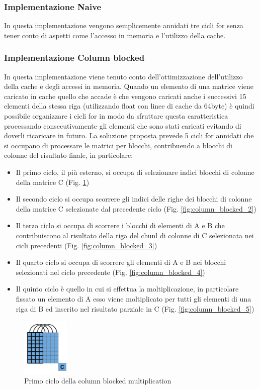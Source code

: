 \documentclass[conference]{IEEEtran}
\begin{document}
\subsubsection{Implementazione Naive}
In questa implementazione vengono semplicemente annidati tre cicli for senza tener conto di aspetti come l'accesso in memoria e l'utilizzo della cache.
\subsubsection{Implementazione Column blocked}
In questa implementazione viene tenuto conto dell'ottimizzazione dell'utilizzo della cache e degli accessi in memoria. Quando un elemento di una matrice viene caricato in cache quello che accade è che vengono caricati anche i successivi 15 elementi della stessa riga (utilizzando float con linee di cache da 64byte) è quindi possibile organizzare i cicli for in modo da sfruttare questa caratteristica processando consecutivamente gli elementi che sono stati caricati evitando di doverli ricaricare in futuro.
La soluzione proposta prevede 5 cicli for annidati che si occupano di processare le matrici per blocchi, contribuendo a blocchi di colonne del risultato finale, in particolare:
\begin{itemize}
    \item Il primo ciclo, il più esterno, si occupa di selezionare indici blocchi di colonne della matrice C (Fig. \ref{fig:column_blocked_1})
    \item Il secondo ciclo si occupa scorrere gli indici delle righe dei blocchi di colonne della matrice C selezionate dal precedente ciclo (Fig. \ref{fig:column_blocked_2})
    \item Il terzo ciclo si occupa di scorrere i blocchi di elementi di A e B che contribuiscono al risultato della riga del chunl di colonne di C selezionata nei cicli precedenti (Fig. \ref{fig:column_blocked_3})
    \item Il quarto ciclo si occupa di scorrere gli elementi di A e B nei blocchi selezionati nel ciclo precedente (Fig. \ref{fig:column_blocked_4})
    \item Il quinto ciclo è quello in cui si effettua la moltiplicazione, in particolare fissato un elemento di A esso viene moltiplicato per tutti gli elementi di una riga di B ed inserito nel risultato parziale in C (Fig. \ref{fig:column_blocked_5})
\end{itemize}
\begin{figure}[H]
    \centering
    \includegraphics[width=0.2\textwidth]{resources/column_blocked_1.png}
    \caption{Primo ciclo della column blocked multiplication}
    \label{fig:column_blocked_1}
\end{figure}
\end{document}
